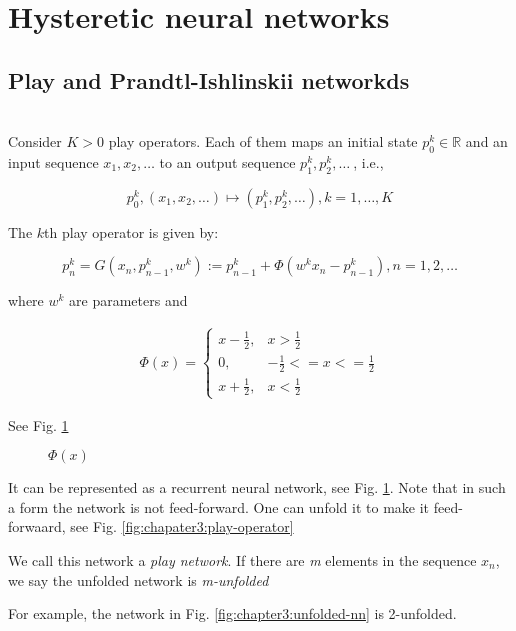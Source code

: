 \section{Hysteretic neural networks\label{sec:chapter3:hnn}}
\subsection{Play and Prandtl-Ishlinskii networkds\label{sec:chapter3:play-and-pi-networks}}
\\
Consider $K > 0$ play operators. Each of them maps an initial state $p_{0}^{k} \in \mathbb{R} $ and an input sequence $x_1, x_2, \ldots$ to an output sequence $p_{1}^{k}, p_{2}^{k}, \ldots \ $, i.e.,

\begin{equation*}
  p_{0}^{k}, (x_1, x_2, \ldots) \mapsto (p_{1}^{k}, p_{2}^{k}, \ldots), k = 1, \ldots, K
\end{equation*}

The $k$th play operator is given by:

\begin{equation}\label{\eqn:chapter3:play-operator}
  p_{n}^{k} = G(x_{n}, p_{n-1}^{k}, w^{k}) := p_{n-1}^{k} + \Phi(w^{k} x_{n} - p_{n-1}^{k}), n = 1, 2, \ldots
\end{equation}

where $w^{k}$ are parameters and

\begin{equation}\label{\eqn:chapter3:phi}
  \begin{aligned*}
    \Phi(x) =
    \begin{cases}
      x - \frac{1}{2}, & x > \frac{1}{2} \\
      0,               & -\frac{1}{2} <= x <= \frac{1}{2} \\
      x + \frac{1}{2}, & x < \frac{1}{2}
    \end{cases}
  \end{aligned*}
\end{equation}

See Fig. \ref{fig:chapter3:phi}

\begin{figure}[htb]
  \centering
  \resizebox{8cm}{!}{}
  \caption{$\Phi(x)$}\label{fig:chapter3:phi}
\end{figure}

It can be represented as a recurrent neural network, see Fig. \ref{fig:chapter3:phi}. Note that in such a form the network is not feed-forward.
One can unfold it to make it feed-forwaard, see Fig. \ref{fig:chapater3:play-operator}

\theoremstyle{definition}
\begin{definition}
We call this network a \textsl{play network}. If there are \textsl{m} elements in the sequence ${x_n}$, we say the unfolded network is \textsl{m-unfolded}
\end{definition}

For example, the network in Fig. \ref{fig:chapter3:unfolded-nn} is 2-unfolded.
